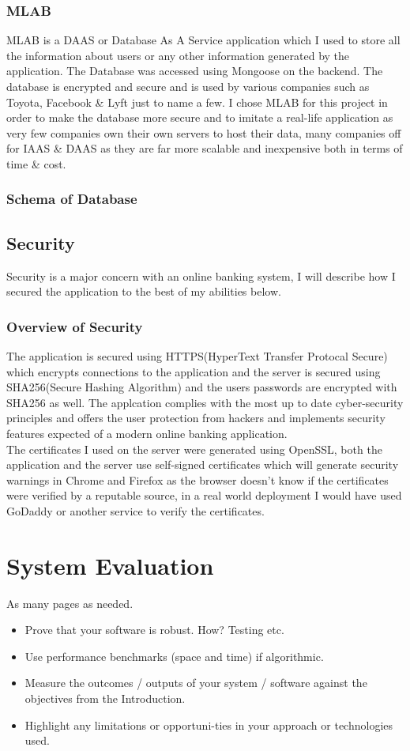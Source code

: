 \subsection{MLAB}
MLAB is a DAAS or Database As A Service application which I used to store all the information about users or any other information
generated by the application.  The Database was accessed using Mongoose on the backend.  The database is encrypted and secure and is used by
various companies such as Toyota, Facebook \& Lyft just to name a few.  I chose MLAB for this project in order to make the database more secure
and to imitate a real-life application as very few companies own their own servers to host their data, many companies off for IAAS \& DAAS as they are far more scalable and inexpensive both in terms of time \& cost.
\subsection{Schema of Database}
\section{Security}
Security is a major concern with an online banking system, I will describe how I secured the application to the best of my abilities below.
\subsection{Overview of Security}
The application is secured using HTTPS(HyperText Transfer Protocal Secure) which encrypts connections to the application and the server
is secured using SHA256(Secure Hashing Algorithm) and the users passwords are encrypted with SHA256 as well.  The applcation complies with the most up to date cyber-security principles and offers the user protection from hackers and implements security features expected of a modern online banking application.
\\
The certificates I used on the server were generated using OpenSSL, both the application and the server use self-signed certificates which will generate security warnings in Chrome and Firefox as the browser doesn't know if the certificates were verified by a reputable source, in a real world deployment I would have used GoDaddy or another service to verify the certificates.
\chapter{System Evaluation}
As many pages as needed.
\begin{itemize}
\item Prove that your software is robust. How? Testing etc.
\item Use performance benchmarks (space and time) if algorithmic.
\item Measure the outcomes / outputs of your system / software against the objectives from the Introduction.
\item Highlight any limitations or opportuni-ties in your approach or technologies used.
\end{itemize}
